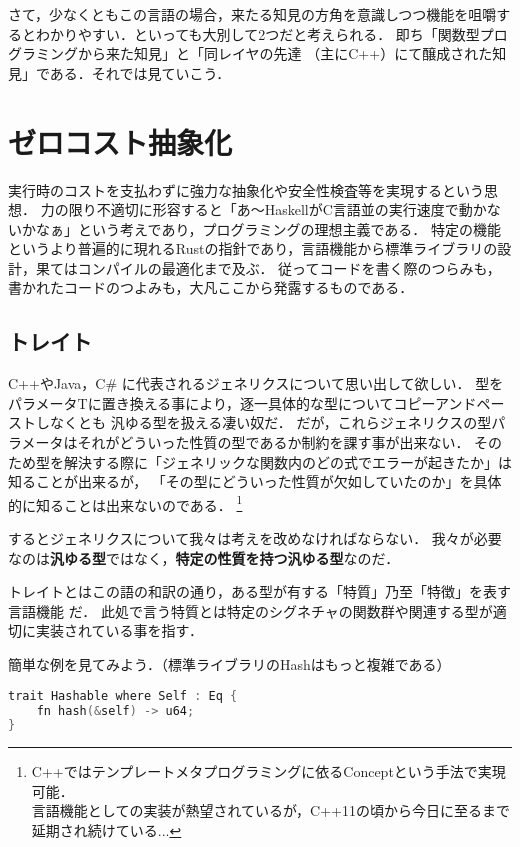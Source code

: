 さて，少なくともこの言語の場合，来たる知見の方角を意識しつつ機能を咀嚼するとわかりやすい．といっても大別して2つだと考えられる．
即ち「関数型プログラミングから来た知見」と「同レイヤの先達 （主にC++）にて醸成された知見」である．それでは見ていこう．

\section{ゼロコスト抽象化}
実行時のコストを支払わずに強力な抽象化や安全性検査等を実現するという思想．
力の限り不適切に形容すると「あ〜HaskellがC言語並の実行速度で動かないかなぁ」という考えであり，プログラミングの理想主義である．
特定の機能というより普遍的に現れるRustの指針であり，言語機能から標準ライブラリの設計，果てはコンパイルの最適化まで及ぶ．
従ってコードを書く際のつらみも，書かれたコードのつよみも，大凡ここから発露するものである．

\subsection{トレイト}
C++やJava，C\# に代表されるジェネリクスについて思い出して欲しい．
型をパラメータTに置き換える事により，逐一具体的な型についてコピーアンドペーストしなくとも
汎ゆる型を扱える凄い奴だ．
だが，これらジェネリクスの型パラメータはそれがどういった性質の型であるか制約を課す事が出来ない．
そのため型を解決する際に「ジェネリックな関数内のどの式でエラーが起きたか」は知ることが出来るが，
「その型にどういった性質が欠如していたのか」を具体的に知ることは出来ないのである．
\footnote{C++ではテンプレートメタプログラミングに依るConceptという手法で実現可能．
  \\ 言語機能としての実装が熱望されているが，C++11の頃から今日に至るまで延期され続けている...}

するとジェネリクスについて我々は考えを改めなければならない．
我々が必要なのは\textbf{汎ゆる型}ではなく，\textbf{特定の性質を持つ汎ゆる型}なのだ．

トレイトとはこの語の和訳の通り，ある型が有する「特質」乃至「特徴」を表す言語機能
だ．
此処で言う特質とは特定のシグネチャの関数群や関連する型が適切に実装されている事を指す．

簡単な例を見てみよう．（標準ライブラリのHashはもっと複雑である）

\begin{lstlisting}[language={C++},caption=Hash可能である事を示すトレイト,label=hash_t]
trait Hashable where Self : Eq {
    fn hash(&self) -> u64;
}
\end{lstlisting}

